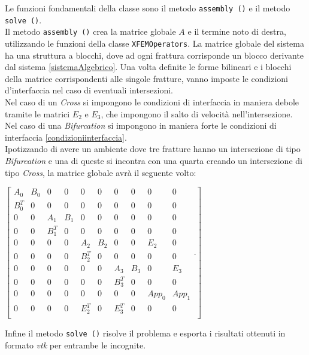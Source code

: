 Le funzioni fondamentali della classe sono il metodo \texttt{assembly ()} e il metodo \texttt{solve ()}. \\
\noindent Il metodo \texttt{assembly ()} crea la matrice globale $A$ e il termine noto di destra, utilizzando le funzioni della classe \texttt{XFEMOperators}. 
La matrice globale del sistema ha una struttura a blocchi, dove ad ogni frattura corrisponde un blocco derivante dal sistema \ref{sistemaAlgebrico}. Una volta definite le forme bilineari e i blocchi della matrice corrispondenti alle singole fratture, vanno imposte le condizioni d'interfaccia nel caso di eventuali intersezioni.\\
\noindent Nel caso di un \textit{Cross} si impongono le condizioni di interfaccia in maniera debole tramite le matrici $E_{2}$ e $E_{3}$, che impongono il salto di velocità nell'intersezione.\\
\noindent Nel caso di una \textit{Bifurcation} si impongono in maniera forte le condizioni di interfaccia \ref{condizioniinterfaccia}.\\
Ipotizzando di avere un ambiente dove tre fratture hanno un intersezione di tipo \textit{Bifurcation} e una di queste si incontra con una quarta creando un intersezione di tipo \textit{Cross}, la matrice globale avrà il seguente volto:\\
 \begin{center}
  $ \left[ \begin{matrix}
 			A_{0} &  B_{0} & 0 & 0 & 0 & 0 & 0 & 0 & 0 & 0\\ 
 			B_{0}^{T} & 0 & 0 & 0 & 0 & 0 & 0 & 0 & 0 & 0\\
 			0 & 0 & A_{1} &  B_{1} & 0 & 0 & 0 & 0 & 0 & 0 \\ 
		 	0 & 0 & B_{1}^{T} & 0 & 0 & 0 & 0 & 0 & 0 & 0 \\
		 	0 & 0 & 0 & 0 & A_{2} &  B_{2} & 0 & 0 & E_{2} & 0\\ 
		 	0 & 0 & 0 & 0 & B_{2}^{T} & 0 & 0 & 0 & 0 & 0\\
		 	0 & 0 & 0 & 0 & 0 & 0 & A_{3} &  B_{3} & 0 & E_{3} \\ 
 			0 & 0 & 0 & 0 & 0 & 0 & B_{3}^{T} & 0 & 0 & 0\\
 			0 & 0 & 0 & 0 & 0 & 0 & 0 & 0 & App_{0} & App_{1} \\
 			0 & 0 & 0 & 0 & E_{2}^{T} & 0 & E_{3}^{T} & 0 & 0 & 0\\
 			\end{matrix}.\right] $ 
  \end{center}
Infine il metodo \texttt{solve ()} risolve il problema e esporta i risultati ottenuti in formato \emph{vtk} per entrambe le incognite.\\

